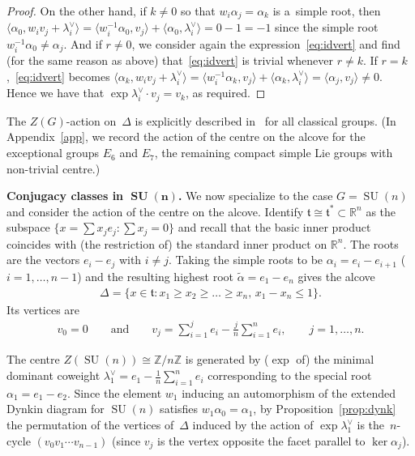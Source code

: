 \documentclass[pdftex]{sigma}
\numberwithin{equation}{section}
\DeclareMathOperator{\SU}{SU}
\begin{document}
\begin{proof}
On the other hand, if $k\neq 0$ so that $w_i \alpha_j = \alpha_k$ is a~simple root, then $\langle \alpha_0,w_i
v_j+\lambda_i^\vee\rangle = \langle w_i^{-1} \alpha_0, v_j \rangle + \langle \alpha_0,\lambda_i^\vee\rangle = 0-1=-1$
since the simple root $w_i^{-1}\alpha_0\neq \alpha_j$.
And if $r\neq 0$, we consider again the expression~\eqref{eq:idvert} and f\/ind (for the same reason as above)
that~\eqref{eq:idvert} is trivial whenever $r\neq k$.
If $r=k$,~\eqref{eq:idvert} becomes $\langle \alpha_k,w_i v_j+ \lambda_i^\vee \rangle = \langle w_i^{-1} \alpha_k,v_j
\rangle + \langle \alpha_k,\lambda_i^\vee \rangle = \langle \alpha_j,v_j \rangle \neq 0$.
Hence we have that $\exp \lambda_i^\vee \cdot v_j = v_k$, as required.
\end{proof}

The $Z(G)$-action on~$\Delta$ is explicitly described in~\cite{TL} for all classical groups.
(In Appendix~\ref{app}, we record the action of the centre on the alcove for the exceptional groups $E_6$ and $E_7$, the
remaining compact simple Lie groups with non-trivial centre.)

{\bf Conjugacy classes in $\boldsymbol{\SU(n)}$.}
We now specialize to the case $G=\SU(n)$ and consider the action of the centre on the alcove.
Identify $\mathfrak{t}\cong \mathfrak{t}^* \subset {\mathbb{R}}^n$ as the subspace $\{x= \sum x_j e_j \colon \sum x_j =0
\}$ and recall that the basic inner product coincides with (the restriction of) the standard inner product on
${\mathbb{R}}^n$.
The roots are the vectors $e_i-e_j$ with $i\neq j$.
Taking the simple roots to be $\alpha_i=e_i-e_{i+1}$ ($i=1,\ldots,n-1$) and the resulting highest root
$\tilde{\alpha}=e_1-e_n$ gives the alcove
\begin{gather*}
\Delta = \{x \in \mathfrak{t} \colon x_1 \geq x_2 \geq \dots \geq x_n, \, x_1-x_n\leq 1 \}.
\end{gather*}
Its vertices are
\begin{gather*}
v_0=0
\qquad
\text{and}
\qquad
v_j=\sum\limits_{i=1}^{j}e_i-\frac{j}{n}\sum\limits_{i=1}^n e_i,
\qquad
j=1, \ldots, n.
\end{gather*}

The centre $Z(\SU(n))\cong {\mathbb{Z}}/n{\mathbb{Z}}$ is generated by ($\exp$ of) the minimal dominant coweight
$\lambda_1^\vee = e_1 -\frac{1}{n}\sum\limits_{i=1}^n e_i$ corresponding to the special root $\alpha_1=e_1-e_2$.
Since the element $w_1$ inducing an automorphism of the extended Dynkin diagram for $\SU(n)$ satisf\/ies
$w_1\alpha_0=\alpha_1$, by Proposition~\ref{prop:dynk} the permutation of the vertices of~$\Delta$ induced by the action
of $\exp \lambda_1^\vee$ is the~$n$-cycle $(v_0   v_1  \cdots   v_{n-1})$ (since $v_j$ is the vertex opposite the
facet parallel to $\ker \alpha_j$).
\end{document}
